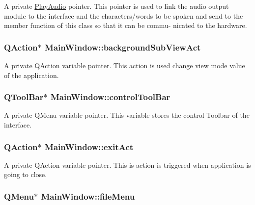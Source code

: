 \label{classMainWindow_a662b41536f24ae8944b1fcd7c3c61d65}
A private \hyperlink{classPlayAudio}{PlayAudio} pointer. This pointer is used to link the audio output module to the interface and the characters/words to be spoken and send to the member function of this class so that it can be commu-\/ nicated to the hardware. \hypertarget{classMainWindow_ac5c06b305f10f9ab46b320e15bcf2255}{
\subsubsection[{backgroundSubViewAct}]{\setlength{\rightskip}{0pt plus 5cm}QAction$\ast$ {\bf MainWindow::backgroundSubViewAct}}}
\label{classMainWindow_ac5c06b305f10f9ab46b320e15bcf2255}
A private QAction variable pointer. This action is used change view mode value of the application. \hypertarget{classMainWindow_aaee0e9ded4637c7fc4ad339712d95986}{
\subsubsection[{controlToolBar}]{\setlength{\rightskip}{0pt plus 5cm}QToolBar$\ast$ {\bf MainWindow::controlToolBar}}}
\label{classMainWindow_aaee0e9ded4637c7fc4ad339712d95986}
A private QMenu variable pointer. This variable stores the control Toolbar of the interface. \hypertarget{classMainWindow_a9d8778fbb596e6a923c2844c2cedfc41}{
\subsubsection[{exitAct}]{\setlength{\rightskip}{0pt plus 5cm}QAction$\ast$ {\bf MainWindow::exitAct}}}
\label{classMainWindow_a9d8778fbb596e6a923c2844c2cedfc41}
A private QAction variable pointer. This is action is triggered when application is going to close. \hypertarget{classMainWindow_a426da48f6e2f865b07a28533c07c4f7a}{
\subsubsection[{fileMenu}]{\setlength{\rightskip}{0pt plus 5cm}QMenu$\ast$ {\bf MainWindow::fileMenu}}}
